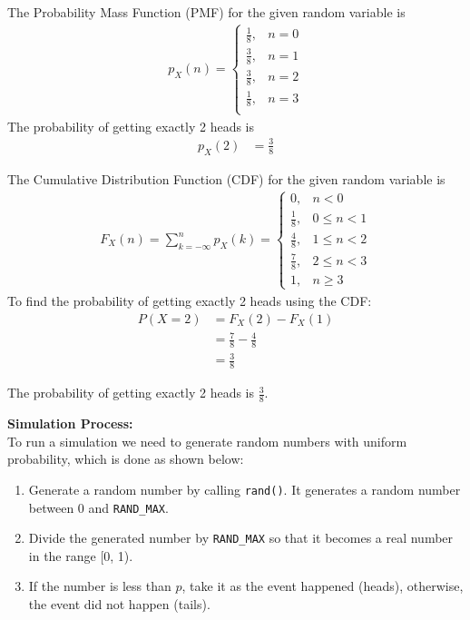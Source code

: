 \documentclass[journal]{IEEEtran}
\begin{document}
The Probability Mass Function (PMF) for the given random variable is
\begin{align}
p_X(n) =
\begin{cases}
    \frac{1}{8}, & n = 0 \\
    \frac{3}{8}, & n = 1 \\
    \frac{3}{8}, & n = 2 \\
    \frac{1}{8}, & n = 3 \\
\end{cases}
\end{align}
The probability of getting exactly 2 heads is
\begin{align}
  p_X(2) &= \frac{3}{8}
\end{align}

The Cumulative Distribution Function (CDF) for the given random variable is
\begin{align}
  F_{X}(n) = \sum_{k=-\infty}^n p_X(k) = \begin{cases}
    0, & n < 0\\
    \frac{1}{8}, & 0 \le n < 1\\
    \frac{4}{8}, & 1 \le n < 2\\
    \frac{7}{8}, & 2 \le n < 3\\
    1, & n \ge 3
  \end{cases}
\end{align}
To find the probability of getting exactly 2 heads using the CDF:
\begin{align}
  P(X = 2) &= F_X(2) - F_X(1) \\
  &= \frac{7}{8} - \frac{4}{8} \\
  &= \frac{3}{8}
\end{align}

The probability of getting exactly 2 heads is \(\frac{3}{8}\).

\textbf{Simulation Process:}\\
To run a simulation we need to generate random numbers with uniform probability, which is done as shown below:
\begin{enumerate}
  \item Generate a random number by calling \texttt{rand()}. It generates a random number between 0 and \texttt{RAND\_MAX}.
  \item Divide the generated number by \texttt{RAND\_MAX} so that it becomes a real number in the range [0, 1).
  \item If the number is less than $p$, take it as the event happened (heads), otherwise, the event did not happen (tails).
\end{enumerate}
\end{document}
